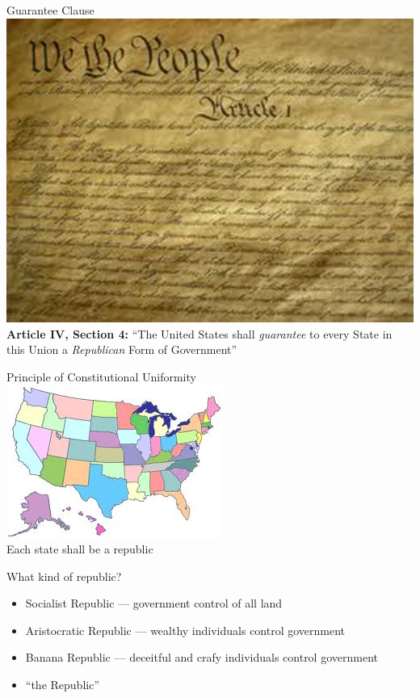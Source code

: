 \begin{frame}{Guarantee Clause}
    \centering
    \includegraphics[height=.7\textheight]{img/constitution.png} \\
    \textbf{Article IV, Section 4:} ``The United States shall \emph{guarantee} to every State in this Union a \emph{Republican} Form of Government''
\end{frame}

\begin{frame}{Principle of Constitutional Uniformity}
    \centering
    \includegraphics[height=.7\textheight]{img/us-map.png} \\
    \huge{Each state shall be a republic} \\
\end{frame}

\begin{frame}{What kind of republic?}
    \begin{itemize}
        \item Socialist Republic --- government control of all land
        \item Aristocratic Republic --- wealthy individuals control government
        \item Banana Republic --- deceitful and crafy individuals control government
        \pause
        \item ``the Republic''
    \end{itemize}
\end{frame}

